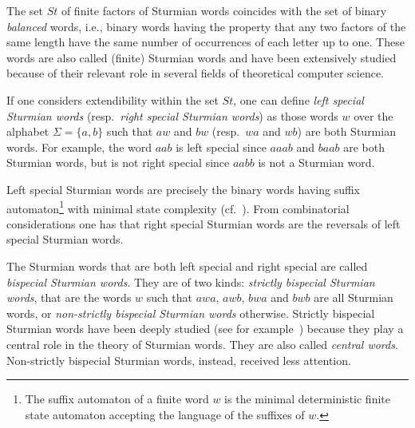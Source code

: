 \documentclass{llncs}
\newcommand{\St}{\textit{St}}
\begin{document}
The set $\St$ of finite factors of Sturmian words coincides with the set of binary \emph{balanced} words, i.e., binary words having the property that any two factors of the same length have the same number of occurrences of each letter up to one. These words are also called (finite) Sturmian words and have been extensively studied because of their relevant role in several fields of theoretical computer science.

If one considers extendibility within the set $\St$, one can define \emph{left special Sturmian words} (resp.~\emph{right special Sturmian words}) \cite{DelMi94} as those words $w$ over the alphabet $\Sigma=\{a,b\}$ such that $aw$ and $bw$ (resp.~$wa$ and $wb$) are both Sturmian words. For example, the word $aab$ is left special since $aaab$ and $baab$ are both Sturmian words, but is not right special since $aabb$ is not a Sturmian word.

Left special Sturmian words are precisely the binary words having suffix automaton\footnote{The suffix automaton of a finite word $w$ is the minimal deterministic finite state automaton accepting the language of the suffixes of $w$.} with minimal state complexity (cf.~\cite{SciZa07,Fi10b}). From combinatorial considerations one has that right special Sturmian words are the reversals of left special Sturmian words.

The Sturmian words that are both left special and right special are called \emph{bispecial Sturmian words}. They are of two kinds: \emph{strictly bispecial Sturmian words}, that are the words $w$ such that $awa$, $awb$, $bwa$ and $bwb$ are all Sturmian words, or \emph{non-strictly bispecial Sturmian words} otherwise. Strictly bispecial Sturmian words have been deeply studied (see for example~\cite{DelMi94,CarDel05}) because they play a central role in the theory of Sturmian words. They are also called \emph{central words}. Non-strictly bispecial Sturmian words, instead, received less attention.
\end{document}
